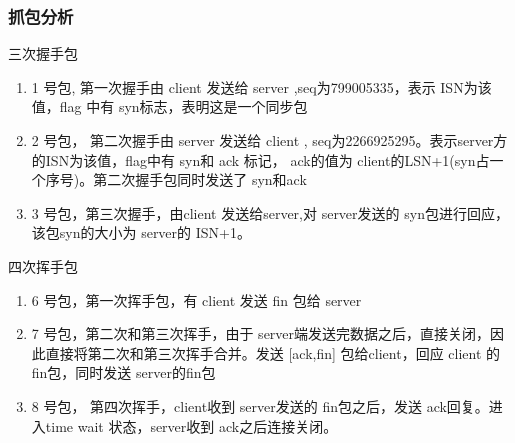 \documentclass[a4paper,UTF8]{ctexart}
\begin{document}
		\subsubsection{抓包分析}
		\par 三次握手包
		\begin{enumerate}
			\item 1 号包, 第一次握手由 client 发送给 server ,seq为799005335，表示 ISN为该值，flag 中有 syn标志，表明这是一个同步包
			\item 2 号包， 第二次握手由 server 发送给 client , seq为2266925295。表示server方的ISN为该值，flag中有 syn和 ack 标记， ack的值为 client的LSN+1(syn占一个序号)。第二次握手包同时发送了 syn和ack
			\item 3 号包，第三次握手，由client 发送给server,对 server发送的 syn包进行回应，该包syn的大小为 server的 ISN+1。
		\end{enumerate}
		\par 四次挥手包
		\begin{enumerate}
			\item 6 号包，第一次挥手包，有 client  发送 fin 包给 server
			\item 7 号包，第二次和第三次挥手，由于 server端发送完数据之后，直接关闭，因此直接将第二次和第三次挥手合并。发送 [ack,fin] 包给client，回应 client 的 fin包，同时发送 server的fin包
			\item 8 号包， 第四次挥手，client收到 server发送的 fin包之后，发送 ack回复。进入time wait 状态，server收到 ack之后连接关闭。
		\end{enumerate}
\end{document}
